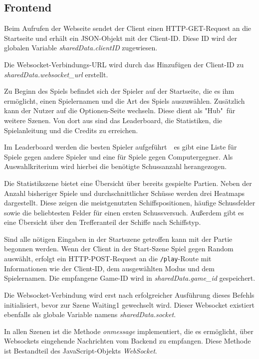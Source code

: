 \documentclass[a4paper, 10pt, conference]{IEEEtran}
\begin{document}
\subsection{Frontend}\label{subsec:frontend}

Beim Aufrufen der Webseite sendet der Client einen HTTP-GET-Request an die Startseite und erhält ein JSON-Objekt mit der Client-ID. Diese ID wird der globalen Variable \textit{sharedData.clientID} zugewiesen.

Die Websocket-Verbindungs-URL wird durch das Hinzufügen der Client-ID zu \textit{sharedData.websocket\_url} erstellt.

Zu Beginn des Spiels befindet sich der Spieler auf der Startseite, die es ihm ermöglicht, einen Spielernamen und die Art des Spiels auszuwählen. Zusätzlich kann der Nutzer auf die Optionen-Seite wechseln. Diese dient als "Hub"\ für weitere Szenen. Von dort aus sind das Leaderboard, die Statistiken, die Spielanleitung und die Credits zu erreichen. 

Im Leaderboard werden die besten Spieler aufgeführt~\textendash~es gibt eine Liste für Spiele gegen andere Spieler und eine für Spiele gegen Computergegner. Als Auswahlkriterium wird hierbei die benötigte Schussanzahl herangezogen.

Die Statistikszene bietet eine Übersicht über bereits gespielte Partien. Neben der Anzahl bisheriger Spiele und durchschnittlicher Schüsse werden drei Heatmaps dargestellt. Diese zeigen die meistgenutzten Schiffspositionen, häufige Schussfelder sowie die beliebtesten Felder für einen ersten Schussversuch. Außerdem gibt es eine Übersicht über den Trefferanteil der Schiffe nach Schiffstyp.

Sind alle nötigen Eingaben in der Startszene getroffen kann mit der Partie begonnen werden. 
Wenn der Client in der Start-Szene \glqq Spiel gegen Random\grqq{} auswählt, erfolgt ein HTTP-POST-Request an die \texttt{/play}-Route mit Informationen wie der Client-ID, dem ausgewählten Modus und dem Spielernamen. Die empfangene Game-ID wird in \textit{sharedData.game\_id} gespeichert.

Die Websocket-Verbindung wird erst nach erfolgreicher Ausführung dieses Befehls initialisiert, bevor zur Szene \glqq Waiting1\grqq{} gewechselt wird. Dieser Websocket existiert ebenfalls als globale Variable namens \textit{sharedData.socket}.

In allen Szenen ist die Methode \textit{onmessage} implementiert, die es ermöglicht, über Websockets eingehende Nachrichten vom Backend zu empfangen. Diese Methode ist Bestandteil des JavaScript-Objekts \textit{WebSocket}.
\end{document}
